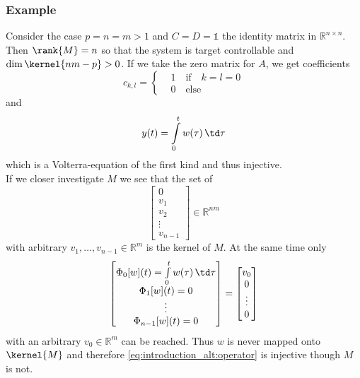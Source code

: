 \subsubsection*{Example}
Consider the case $p=n=m > 1$ and $C=D=\mathbb{1}$ the identity matrix in 
$\mathbb{R}^{n\times n}$. Then $\rank{M}=n$ so that the system is target controllable and 
$\dim{\kernel{nm-p}} > 0$. If we take the zero matrix for $A$, we get coefficients 
\begin{equation}
c_{k,l} = \left\{
\begin{aligned}
 &1 \quad\text{if} \quad k=l=0 \\ &0 \quad \text{else}
\end{aligned}
\right.
\end{equation}
and
\begin{equation}
y(t) = \int\limits_0^t w(\tau) \, \td \tau
\end{equation}
which is a Volterra-equation of the first kind and thus injective.\\

If we closer investigate $M$ we see that the set of
\begin{equation}
\begin{bmatrix}
0 \\ v_1 \\v_2 \\ \vdots \\ v_{n-1} 
\end{bmatrix}\in \mathbb{R}^{nm}
\end{equation}
with arbitrary $v_1,\ldots,v_{n-1}\in\mathbb{R}^m$ is the kernel of $M$. At the same 
time only
\begin{equation}\begin{bmatrix}
\Phi_0[w](t) = \int\limits_0^t w(\tau) \,  \td \tau \\
\Phi_1[w](t) = 0 \\ \vdots \\ \Phi_{n-1}[w](t) = 0
\end{bmatrix} =
\begin{bmatrix}
v_0 \\ 0 \\ \vdots \\0
\end{bmatrix} 
\end{equation}
with an arbitrary $v_0\in\mathbb{R}^m$ can be reached. Thus $w$ is never mapped onto 
$\kernel{M}$ and therefore \eqref{eq:introduction_alt:operator} is injective though 
$M$ is not.